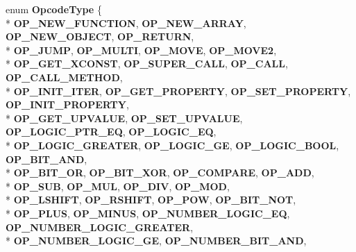 \begin{DoxyCompactItemize}
\item 
enum {\bfseries Opcode\+Type} \{ \\*
{\bfseries O\+P\+\_\+\+N\+E\+W\+\_\+\+F\+U\+N\+C\+T\+I\+ON}, 
{\bfseries O\+P\+\_\+\+N\+E\+W\+\_\+\+A\+R\+R\+AY}, 
{\bfseries O\+P\+\_\+\+N\+E\+W\+\_\+\+O\+B\+J\+E\+CT}, 
{\bfseries O\+P\+\_\+\+R\+E\+T\+U\+RN}, 
\\*
{\bfseries O\+P\+\_\+\+J\+U\+MP}, 
{\bfseries O\+P\+\_\+\+M\+U\+L\+TI}, 
{\bfseries O\+P\+\_\+\+M\+O\+VE}, 
{\bfseries O\+P\+\_\+\+M\+O\+V\+E2}, 
\\*
{\bfseries O\+P\+\_\+\+G\+E\+T\+\_\+\+X\+C\+O\+N\+ST}, 
{\bfseries O\+P\+\_\+\+S\+U\+P\+E\+R\+\_\+\+C\+A\+LL}, 
{\bfseries O\+P\+\_\+\+C\+A\+LL}, 
{\bfseries O\+P\+\_\+\+C\+A\+L\+L\+\_\+\+M\+E\+T\+H\+OD}, 
\\*
{\bfseries O\+P\+\_\+\+I\+N\+I\+T\+\_\+\+I\+T\+ER}, 
{\bfseries O\+P\+\_\+\+G\+E\+T\+\_\+\+P\+R\+O\+P\+E\+R\+TY}, 
{\bfseries O\+P\+\_\+\+S\+E\+T\+\_\+\+P\+R\+O\+P\+E\+R\+TY}, 
{\bfseries O\+P\+\_\+\+I\+N\+I\+T\+\_\+\+P\+R\+O\+P\+E\+R\+TY}, 
\\*
{\bfseries O\+P\+\_\+\+G\+E\+T\+\_\+\+U\+P\+V\+A\+L\+UE}, 
{\bfseries O\+P\+\_\+\+S\+E\+T\+\_\+\+U\+P\+V\+A\+L\+UE}, 
{\bfseries O\+P\+\_\+\+L\+O\+G\+I\+C\+\_\+\+P\+T\+R\+\_\+\+EQ}, 
{\bfseries O\+P\+\_\+\+L\+O\+G\+I\+C\+\_\+\+EQ}, 
\\*
{\bfseries O\+P\+\_\+\+L\+O\+G\+I\+C\+\_\+\+G\+R\+E\+A\+T\+ER}, 
{\bfseries O\+P\+\_\+\+L\+O\+G\+I\+C\+\_\+\+GE}, 
{\bfseries O\+P\+\_\+\+L\+O\+G\+I\+C\+\_\+\+B\+O\+OL}, 
{\bfseries O\+P\+\_\+\+B\+I\+T\+\_\+\+A\+ND}, 
\\*
{\bfseries O\+P\+\_\+\+B\+I\+T\+\_\+\+OR}, 
{\bfseries O\+P\+\_\+\+B\+I\+T\+\_\+\+X\+OR}, 
{\bfseries O\+P\+\_\+\+C\+O\+M\+P\+A\+RE}, 
{\bfseries O\+P\+\_\+\+A\+DD}, 
\\*
{\bfseries O\+P\+\_\+\+S\+UB}, 
{\bfseries O\+P\+\_\+\+M\+UL}, 
{\bfseries O\+P\+\_\+\+D\+IV}, 
{\bfseries O\+P\+\_\+\+M\+OD}, 
\\*
{\bfseries O\+P\+\_\+\+L\+S\+H\+I\+FT}, 
{\bfseries O\+P\+\_\+\+R\+S\+H\+I\+FT}, 
{\bfseries O\+P\+\_\+\+P\+OW}, 
{\bfseries O\+P\+\_\+\+B\+I\+T\+\_\+\+N\+OT}, 
\\*
{\bfseries O\+P\+\_\+\+P\+L\+US}, 
{\bfseries O\+P\+\_\+\+M\+I\+N\+US}, 
{\bfseries O\+P\+\_\+\+N\+U\+M\+B\+E\+R\+\_\+\+L\+O\+G\+I\+C\+\_\+\+EQ}, 
{\bfseries O\+P\+\_\+\+N\+U\+M\+B\+E\+R\+\_\+\+L\+O\+G\+I\+C\+\_\+\+G\+R\+E\+A\+T\+ER}, 
\\*
{\bfseries O\+P\+\_\+\+N\+U\+M\+B\+E\+R\+\_\+\+L\+O\+G\+I\+C\+\_\+\+GE}, 
{\bfseries O\+P\+\_\+\+N\+U\+M\+B\+E\+R\+\_\+\+B\+I\+T\+\_\+\+A\+ND}, 

\end{DoxyCompactItemize}
